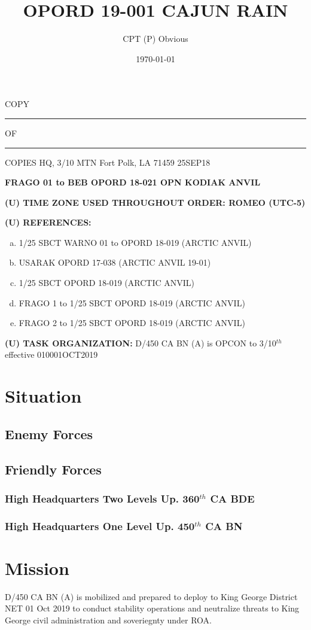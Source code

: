 \documentclass[12pt,letterpaper,notitlepage]{article}
\title{OPORD 19-001 CAJUN RAIN}
\author{CPT (P) Obvious}
\date{\today}
\newcommand{\unclass}{(U)}
\newcommand{\uptwo}{360$^{th}$ CA BDE}
\newcommand{\upone}{450$^{th}$ CA BN}
\newcommand{\unit}{D/450 CA BN (A)}
\newcommand{\timezone}{ROMEO (UTC-5)}
\begin{document}
\begin{flushright}
COPY \rule{1cm}{0.4pt} OF \rule{1cm}{0.4pt} COPIES \linebreak
HQ, 3/10 MTN \linebreak
Fort Polk, LA 71459 \linebreak
25SEP18
\end{flushright}

\textbf{FRAGO 01 to BEB OPORD 18-021 OPN KODIAK ANVIL}

\textbf{\unclass{} TIME ZONE USED THROUGHOUT ORDER: \timezone}

\textbf{\unclass{} REFERENCES:}
\begin{enumerate}[(a)]
\item 1/25 SBCT WARNO 01 to OPORD 18-019 (ARCTIC ANVIL)
\item USARAK OPORD 17-038 (ARCTIC ANVIL 19-01)
\item 1/25 SBCT OPORD 18-019 (ARCTIC ANVIL)
\item FRAGO 1 to 1/25 SBCT OPORD 18-019 (ARCTIC ANVIL)
\item FRAGO 2 to 1/25 SBCT OPORD 18-019 (ARCTIC ANVIL)
\end{enumerate}

\textbf{\unclass{} TASK ORGANIZATION:}
\unit{} is OPCON to 3/10$^{th}$ effective 010001OCT2019

\section{Situation}
\subsection{Enemy Forces}
\subsection{Friendly Forces}
\subsubsection{High Headquarters Two Levels Up. \uptwo{}}
\subsubsection{High Headquarters One Level Up. \upone{}}

\section{Mission}
\unit{} is mobilized and prepared to deploy to King George District NET 01 Oct 2019
to conduct stability operations and neutralize threats to King George civil
administration and soveriegnty under ROA.
\end{document}
